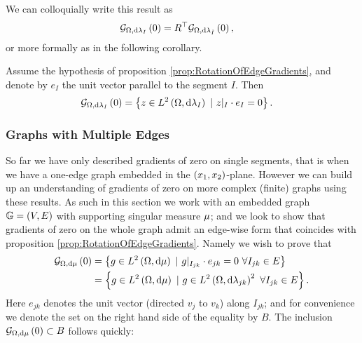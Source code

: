 We can colloquially write this result as
\begin{align*}
	\mathcal{G}_{ \Omega, \mathrm{d}\lambda_I}\left( 0 \right) &= R^\top\mathcal{G}_{ \Omega, \mathrm{d}\lambda_{\tilde{I}}}\left( 0 \right),
\end{align*}
or more formally as in the following corollary.
\begin{cory} \label{cory:Grad0SingleEdge}
	Assume the hypothesis of proposition \ref{prop:RotationOfEdgeGradients}, and denote by $e_I$ the unit vector parallel to the segment $I$.
	Then
	\begin{align*}
		\mathcal{G}_{ \Omega, \mathrm{d}\lambda_I}\left( 0 \right) &= \left\{ z\in L^{2}\left( \Omega,\mathrm{d}\lambda_I \right) \ \vert \ z\vert_{I}\cdot e_I = 0 \right\}.
	\end{align*}
\end{cory}

\subsubsection{Graphs with Multiple Edges}
So far we have only described gradients of zero on single segments, that is when we have a one-edge graph embedded in the $\left( x_1,x_2 \right)$-plane.
However we can build up an understanding of gradients of zero on more complex (finite) graphs using these results.
As such in this section we work with an embedded graph $\mathbb{G} = \left( V,E \right)$ with supporting singular measure $\mu$; and we look to show that gradients of zero on the whole graph admit an edge-wise form that coincides with proposition \ref{prop:RotationOfEdgeGradients}.
Namely we wish to prove that
\begin{align*}
	\gradZero{\ddom}{\ddmes} &= \clbracs{g\in\ltwo{\ddom}{\ddmes} \ \vert \ g\vert_{I_{jk}}\cdot e_{jk}=0 \ \forall I_{jk}\in E} \\
	&= \clbracs{g\in\ltwo{\ddom}{\ddmes} \ \vert \ g\in\ltwo{\ddom}{\lambda_{jk}}^2 \ \forall I_{jk}\in E}.
\end{align*}
Here $e_{jk}$ denotes the unit vector (directed $v_j$ to $v_k$) along $I_{jk}$; and for convenience we denote the set on the right hand side of the equality by $B$.
The inclusion $\mathcal{G}_{ \Omega, \mathrm{d}\mu}\left( 0 \right) \subset B$ follows quickly:

